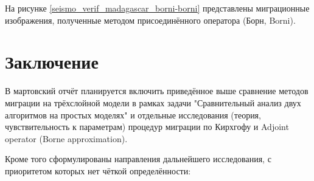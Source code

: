 \documentclass{article}
\begin{document}
На рисунке \ref{seismo_verif_madagascar_borni-borni} представлены миграционные изображения, полученные методом присоединённого оператора (Борн, Borni).

\noindent
\begin{minipage}{\linewidth}
\label{seismo_verif_madagascar_borni-borni}
\end{minipage}

\section{Заключение}


В мартовский отчёт планируется включить приведённое выше сравнение методов миграции на трёхслойной модели в рамках задачи "Сравнительный анализ двух алгоритмов на простых моделях" и отдельные исследования (теория, чувствительность к параметрам) процедур миграции по Кирхгофу и Adjoint operator (Borne approximation).

Кроме того сформулированы направления дальнейшего исследования, с приоритетом которых нет чёткой определённости: 
\end{document}
